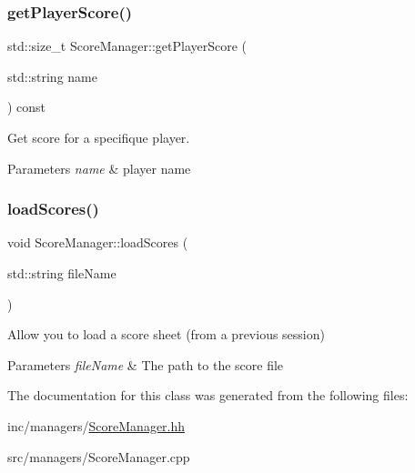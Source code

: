 \subsubsection{\texorpdfstring{get\+Player\+Score()}{getPlayerScore()}}
{\footnotesize\ttfamily std\+::size\+\_\+t Score\+Manager\+::get\+Player\+Score (\begin{DoxyParamCaption}\item[{std\+::string}]{name }\end{DoxyParamCaption}) const}



Get score for a specifique player. 


\begin{DoxyParams}{Parameters}
{\em name} & player name \\
\hline
\end{DoxyParams}
\mbox{\label{classScoreManager_a4c345e9d06ef6f7fb937c43fa51dddd5}} 
\subsubsection{\texorpdfstring{load\+Scores()}{loadScores()}}
{\footnotesize\ttfamily void Score\+Manager\+::load\+Scores (\begin{DoxyParamCaption}\item[{std\+::string}]{file\+Name }\end{DoxyParamCaption})}



Allow you to load a score sheet (from a previous session) 


\begin{DoxyParams}{Parameters}
{\em file\+Name} & The path to the score file \\
\hline
\end{DoxyParams}


The documentation for this class was generated from the following files\+:\begin{DoxyCompactItemize}
\item 
inc/managers/\hyperlink{ScoreManager_8hh}{Score\+Manager.\+hh}\item 
src/managers/Score\+Manager.\+cpp\end{DoxyCompactItemize}
